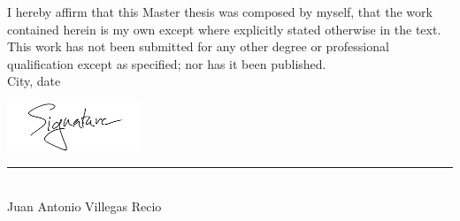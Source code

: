 I hereby affirm that this Master thesis was composed by myself, that the work contained herein is my own except where explicitly stated otherwise in the text. This work has not been submitted for any other degree or professional qualification except as specified; nor has it been published. \\
\newline
City, date

\vspace{0cm}
\noindent\includegraphics[width=0.3\textwidth]{img/mysignature.png}

\vspace*{-1.1cm}
\noindent \rule{0.3\textwidth}{.3pt}\\
\vspace{0.3cm}
\noindent \large{Juan Antonio Villegas Recio}